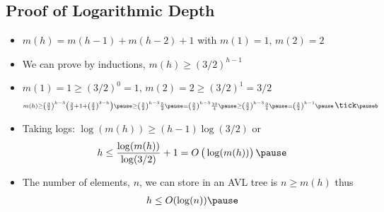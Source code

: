 \begin{slide}
\section[-2]{Proof of Logarithmic Depth}

\begin{PauseHighLight}
  \begin{itemize}\squeeze
  \item $m(h) = m(h-1) + m(h-2) + 1$ with $m(1)=1$, $m(2)=2$\pause
  \item We can prove by inductions, $m(h) \geq (3/2)^{h-1}$\pause
  \item $m(1)=1 \geq (3/2)^0 = 1$, $m(2)=2 \geq (3/2)^1 =3/2$\pause\,
    \tick\pauseb
    \begin{align*} \scriptstyle
      m(h) \geq \left(\frac{3}{2}\right)^{h-3} \left(\frac{3}{2} +1 +
      \left(\frac{3}{2}\right)^{3-h} \right) \pause \geq
      \left(\frac{3}{2}\right)^{h-3} \frac{5}{2} \pause =
      \left(\frac{3}{2}\right)^{h-3} \frac{10}{4} \pause
      \geq \left(\frac{3}{2}\right)^{h-3} \frac{9}{4} \pause =
      \left(\frac{3}{2}\right)^{h-1} \pause \, \mbox{\tick}\pauseb
    \end{align*}
  \item Taking logs: $\log(m(h)) \geq (h-1) \log(3/2)$ or
    \begin{align*}
      h \leq \frac{\log(m(h))}{\log(3/2)} +1 =
      O\left(\strut\log(m(h))\right)\pause 
    \end{align*}
  \item The number of elements, $n$, we can store in an AVL tree is
    $n\geq m(h)$ thus
    \begin{align*}
      h \leq O(\log(n))\pause
    \end{align*}
  \end{itemize}
\end{PauseHighLight}

\end{slide}


